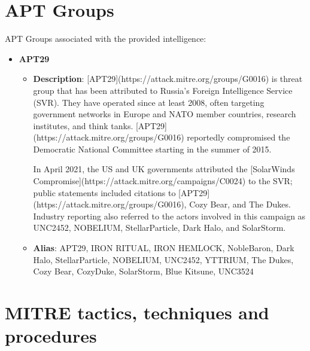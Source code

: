 \section{APT Groups}

APT Groups associated with the provided intelligence:

\begin{itemize}\item \textbf{APT29}\begin{itemize}
\item \textbf{Description}: [APT29](https://attack.mitre.org/groups/G0016) is threat group that has been attributed to Russia's Foreign Intelligence Service (SVR). They have operated since at least 2008, often targeting government networks in Europe and NATO member countries, research institutes, and think tanks. [APT29](https://attack.mitre.org/groups/G0016) reportedly compromised the Democratic National Committee starting in the summer of 2015.

In April 2021, the US and UK governments attributed the [SolarWinds Compromise](https://attack.mitre.org/campaigns/C0024) to the SVR; public statements included citations to [APT29](https://attack.mitre.org/groups/G0016), Cozy Bear, and The Dukes. Industry reporting also referred to the actors involved in this campaign as UNC2452, NOBELIUM, StellarParticle, Dark Halo, and SolarStorm.
\item \textbf{Alias}: APT29, IRON RITUAL, IRON HEMLOCK, NobleBaron, Dark Halo, StellarParticle, NOBELIUM, UNC2452, YTTRIUM, The Dukes, Cozy Bear, CozyDuke, SolarStorm, Blue Kitsune, UNC3524
\end{itemize}
\end{itemize}

\section{MITRE tactics, techniques and procedures}

